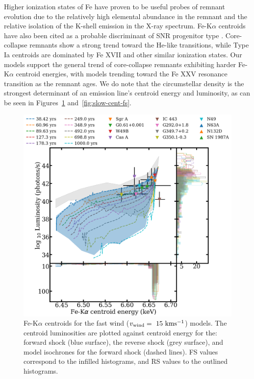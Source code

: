 \documentclass[twocolumn]{aastex631}
\begin{document}
Higher ionization states of Fe have proven to be useful probes of remnant evolution due to the relatively high elemental abundance in the remnant and the relative isolation of the K-shell emission in the X-ray spectrum.  Fe-K$\alpha$ centroids have also been cited as a probable discriminant of SNR progenitor type \citep{yamaguchi}. Core-collapse remnants show a strong trend toward the He-like transitions, while Type Ia centroids are dominated by Fe XVII and other similar ionization states. Our models support the general trend of core-collapse remnants exhibiting harder Fe-K$\alpha$ centroid energies, with models trending toward the Fe XXV resonance transition as the remnant ages. We do note that the circumstellar density is the strongest determinant of an emission line's centroid energy and luminosity, as can be seen in Figures~\ref{fig:fast-cent-fs} and~\ref{fig:slow-cent-fs}. 
\begin{figure}[htb]
    \centering
    \includegraphics[scale=0.18]{fscentfast.png}
    \caption{Fe-K$\alpha$ centroids for the fast wind ($v_{\rm wind}=~15~\rm kms^{-1}$) models. The centroid luminosities are plotted against centroid energy for the: forward shock (blue surface), the reverse shock (grey surface), and model isochrones for the forward shock (dashed lines). FS values correspond to the infilled histograms, and RS values to the outlined histograms.}
    \label{fig:fast-cent-fs}
\end{figure}
\end{document}

